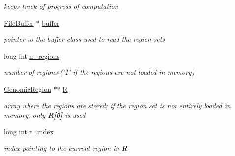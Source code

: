 \begin{DoxyCompactItemize}
\begin{DoxyCompactList}\small\item\em keeps track of progress of computation \end{DoxyCompactList}\item 
\hypertarget{classGenomicRegionSet_adf3a5598e31ddbb5b381125925362085}{
\hyperlink{classFileBuffer}{FileBuffer} $\ast$ \hyperlink{classGenomicRegionSet_adf3a5598e31ddbb5b381125925362085}{buffer}}
\label{classGenomicRegionSet_adf3a5598e31ddbb5b381125925362085}

\begin{DoxyCompactList}\small\item\em pointer to the buffer class used to read the region sets \end{DoxyCompactList}\item 
\hypertarget{classGenomicRegionSet_a5293292428aa06145b38be4b96ab05e4}{
long int \hyperlink{classGenomicRegionSet_a5293292428aa06145b38be4b96ab05e4}{n\_\-regions}}
\label{classGenomicRegionSet_a5293292428aa06145b38be4b96ab05e4}

\begin{DoxyCompactList}\small\item\em number of regions ('1' if the regions are not loaded in memory) \end{DoxyCompactList}\item 
\hypertarget{classGenomicRegionSet_a206d91b443832800afc04f786d15971d}{
\hyperlink{classGenomicRegion}{GenomicRegion} $\ast$$\ast$ \hyperlink{classGenomicRegionSet_a206d91b443832800afc04f786d15971d}{R}}
\label{classGenomicRegionSet_a206d91b443832800afc04f786d15971d}

\begin{DoxyCompactList}\small\item\em array where the regions are stored; if the region set is not entirely loaded in memory, only {\bfseries R\mbox{[}0\mbox{]}} is used \end{DoxyCompactList}\item 
\hypertarget{classGenomicRegionSet_ad89185b88d5b37161cc65bc84b421c0e}{
long int \hyperlink{classGenomicRegionSet_ad89185b88d5b37161cc65bc84b421c0e}{r\_\-index}}
\label{classGenomicRegionSet_ad89185b88d5b37161cc65bc84b421c0e}

\begin{DoxyCompactList}\small\item\em index pointing to the current region in {\bfseries R} \end{DoxyCompactList}\end{DoxyCompactItemize}
